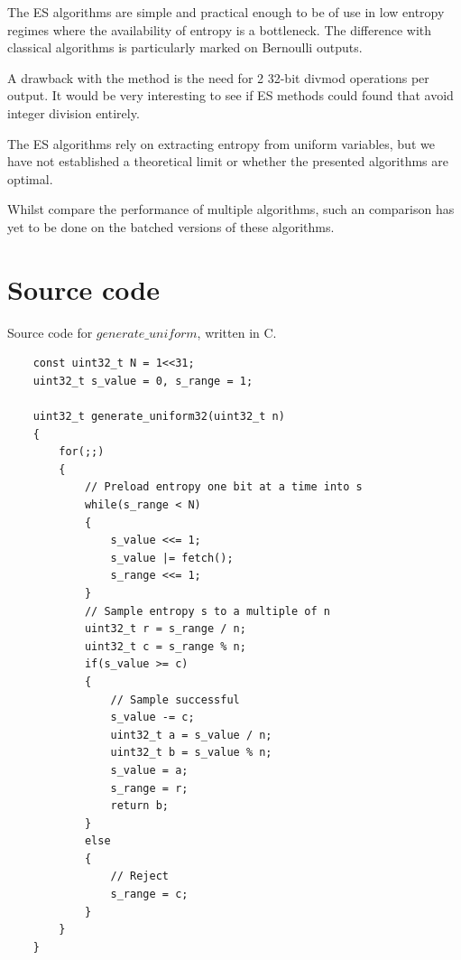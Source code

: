 \documentclass[12pt]{article}
\begin{document}
The ES algorithms are simple and practical enough to be of use in low entropy regimes where the availability of entropy is a bottleneck. The difference with classical algorithms is particularly marked on Bernoulli outputs.

A drawback with the method is the need for 2 32-bit divmod operations per output. It would be very interesting to see if ES methods could found that avoid integer division entirely.

The ES algorithms rely on extracting entropy from uniform variables, but we have not established a theoretical limit or whether the presented algorithms are optimal.

Whilst \cite{saad2020fldr} compare the performance of multiple algorithms, such an comparison has yet to be done on the batched versions of these algorithms.



\printbibliography

\appendix

\section {Source code} \label{app:source-code}

Source code for $generate\_uniform$, written in C.

\begin{verbatim}
    const uint32_t N = 1<<31;
    uint32_t s_value = 0, s_range = 1;

    uint32_t generate_uniform32(uint32_t n)
    {
        for(;;)
        {
            // Preload entropy one bit at a time into s
            while(s_range < N)
            {
                s_value <<= 1;
                s_value |= fetch();
                s_range <<= 1;
            }
            // Sample entropy s to a multiple of n
            uint32_t r = s_range / n;
            uint32_t c = s_range % n;
            if(s_value >= c)
            {
                // Sample successful
                s_value -= c;
                uint32_t a = s_value / n;
                uint32_t b = s_value % n;
                s_value = a;
                s_range = r; 
                return b;
            }
            else
            {
                // Reject
                s_range = c;
            }
        }
    }
\end{verbatim}
\end{document}

